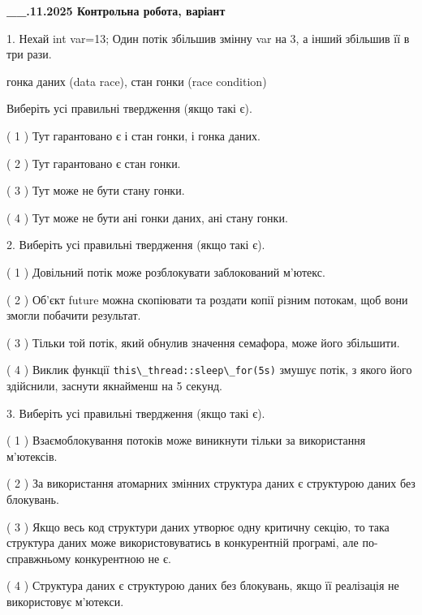 \documentclass[12pt, ukrainian]{article}
\def\code#1{\Verb!#1!}
\begin{document}
\newpage
\begin {large}

\textbf{\_\_.11.2025 Контрольна робота, варіант  }\par


{
1. Нехай int var=13; Один потік збільшив змінну var на 3, а інший збільшив її в три рази.

гонка даних (data race), стан гонки (race condition)

Виберіть усі правильні твердження (якщо такі є).\par
\vspace{2mm}
( 1 ) Тут гарантовано є і стан гонки, і гонка даних.%

( 2 ) Тут гарантовано є стан гонки.%

( 3 ) Тут може не бути стану гонки.%

( 4 ) Тут може не бути ані гонки даних, ані стану гонки.%


2. Виберіть усі правильні твердження (якщо такі є).\par
\vspace{2mm}

( 1 ) Довільний потік може розблокувати заблокований м’ютекс.%

( 2 ) Об’єкт future можна скопіювати та роздати копії різним потокам, щоб вони змогли побачити результат.%

( 3 ) Тільки той потік, який обнулив значення семафора, може його збільшити.%

( 4 ) Виклик функції \code{this\_thread::sleep\_for(5s)} змушує потік, з якого його здійснили, заснути якнайменш на 5 секунд.%


3. Виберіть усі правильні твердження (якщо такі є).\par
\vspace{2mm}

( 1 ) Взаємоблокування потоків може виникнути тільки за використання м’ютексів.%

( 2 ) За використання атомарних змінних структура даних є структурою даних без блокувань.%

( 3 ) Якщо весь код структури даних утворює одну критичну секцію, то така структура даних може використовуватись в конкурентній програмі, але по-справжньо\-му конкурентною не є.%

( 4 ) Структура даних є структурою даних без блокувань, якщо її реалізація не використовує м’ютекси.%


}
\end{large}
\end{document}
